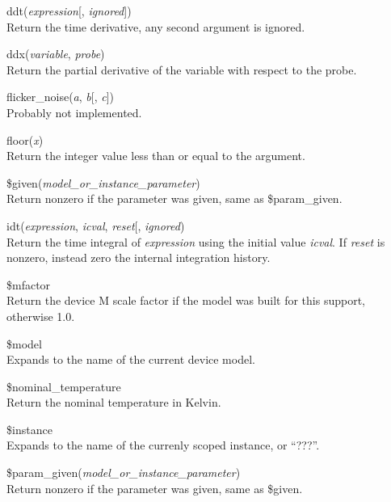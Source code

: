 \begin{description}
\item{\vt ddt}({\it expression\/}[, {\it ignored\/}])\\
Return the time derivative, any second argument is ignored.

\item{\vt ddx}({\it variable\/}, {\it probe\/})\\
Return the partial derivative of the variable with respect to the
probe.

\item{\vt flicker\_noise}({\it a\/}, {\it b\/}[, {\it c\/}])\\
Probably not implemented.

\item{\vt floor}({\it x\/})\\
Return the integer value less than or equal to the argument.

\item{\vt \$given}({\it model\_or\_instance\_parameter\/})\\
Return nonzero if the parameter was given, same as {\vt
\$param\_given}.

\item{\vt idt}({\it expression\/}, {\it icval\/}, {\it reset\/}[,
 {\it ignored\/})\\
Return the time integral of {\it expression} using the initial value
{\it icval\/}.  If {\it reset} is nonzero, instead zero the internal
integration history.

\item{\vt \$mfactor}\\
Return the device {\vt M} scale factor if the model was built for this
support, otherwise 1.0.

\item{\vt \$model}\\
Expands to the name of the current device model.

\item{\vt \$nominal\_temperature}\\
Return the nominal temperature in Kelvin.

\item{\vt \$instance}\\
Expands to the name of the currenly scoped instance, or ``???''.

\item{\vt \$param\_given}({\it model\_or\_instance\_parameter\/})\\
Return nonzero if the parameter was given, same as {\vt \$given}.


\end{description}
